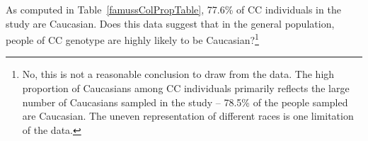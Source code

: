 
\begin{exercise}
As computed in Table~\ref{famussColPropTable}, 77.6\% of CC individuals in the study are Caucasian. Does this data suggest that in the general population, people of CC genotype are highly likely to be Caucasian?\footnote{No, this is not a reasonable conclusion to draw from the data. The high proportion of Caucasians among CC individuals primarily reflects the large number of Caucasians sampled in the study -- 78.5\% of the people sampled are Caucasian. The uneven representation of different races is one limitation of the  data.}
\end{exercise}

